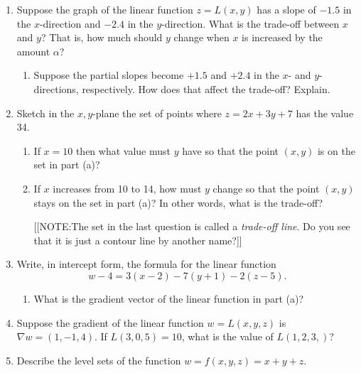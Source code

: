 \begin{enumerate}
  \begin{enumerate}
  \item What is the value of $L(7, 7)$?

  \item If $L(7, \beta) = -2$, what is the value of $\beta$?

  \item What is the value of $\Delta z/\Delta y$?

  \item Write the formula for $L(x, y)$ in intercept form.


\end{enumerate}
\item Suppose the graph of the linear function $z = L(x, y)$ has a
slope of $-1.5$ in the $x$-direction and $-2.4$ in the $y$-direction.
What is the trade-off between $x$ and $y$?  That is, how much should
$y$ change when $x$ is increased by the amount $\alpha$?

  \begin{enumerate}
  \item Suppose the partial slopes become $+1.5$ and $+2.4$ in the $x$-
and $y$-directions, respectively.  How does that affect the trade-off?
Explain.


\end{enumerate}
\item Sketch in the $x, y$-plane the set of points where $z = 2x + 3y
+ 7$ has the value 34.

  \begin{enumerate}
  \item If $x = 10$ then what value must $y$ have so that the point $(x,
y)$ is on the set in part (a)?

  \item If $x$ increases from 10 to 14, how must $y$ change so that the
point $(x, y)$ stays on the set in part (a)?  In other words, what is
the trade-off?





[[NOTE:The set in the last question is called a {\em trade-off
    line}. Do you see that it is just a contour
  line by another name?]]


\end{enumerate}
\item Write, in intercept form, the formula for the linear function
	\[
w - 4 = 3(x - 2) - 7(y + 1) - 2( z - 5).
\]


  \begin{enumerate}
  \item What is the gradient vector of the linear function in part (a)?


\end{enumerate}
\item Suppose the gradient of the linear function $w = L(x, y, z)$ is
$\nabla w = (1, -1, 4)$.  If $L(3, 0, 5) = 10$, what is the value of
$L(1, 2, 3,)$?


\item Describe the level sets of the function $w = f(x, y, z) = x + y +
z$.


\end{enumerate}
